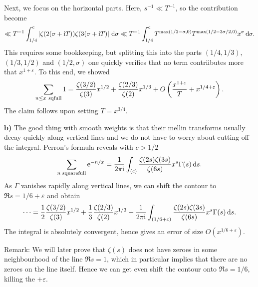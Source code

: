\documentclass[a4paper,11pt]{article}
\begin{document}
Next, we focus on the horizontal parts. Here, $s^{-1} \ll T^{-1}$, so the
contribution become
\[
    \ll T^{-1} \int_{1/4}^c \left\lvert \zeta(2(\sigma+\mathrm i T))\zeta(3(\sigma+\mathrm i T) \right\rvert \mathrm{\,d} 
    \sigma \ll T^{-1} \int_{1/4}^c T^{\max(1/2-\sigma, 0)} T^{\max(1/2-3\sigma/2,0)}
    x^\sigma \mathrm{\,d} \sigma.
\]
This requires some bookkeeping, but splitting this into the parts
$(1/4, 1/3)$, $(1/3, 1/2)$ and $(1/2, \sigma)$ one quickly verifies that 
no term contriibutes more that $x^{1+\varepsilon}$. To this end, we showed
\[
    \sum_{n \leq x \rm \ sqfull} 1 
    = \frac{\zeta(3/2)}{\zeta(3)}x^{1/2} + \frac{\zeta(2/3)}{\zeta(2)} x^{1/3}
    + O\left( \frac{x^{1+\varepsilon}}T + x^{1/4 + \varepsilon}\right).
\]
The claim follows upon setting $T = x^{3/4}$. 

\textbf{b)} The good thing with smooth weights is that their mellin transforms
usually decay quickly along vertical lines and we do not have to worry about cutting
off the integral. Perron's formula reveals with $c > 1/2$
\[
    \sum_{n \text{ squarefull}} \mathrm e^{-n/x} = \frac{1}{2 \pi \mathrm i} \int_{(c)} \frac{\zeta(2s) \zeta(3s)}
    {\zeta(6s)} x^s \Gamma(s) \mathrm{\,d} s.
\]
As $\Gamma$ vanishes rapidly along vertical lines, we can shift the contour to 
$\Re s = 1/6 + \varepsilon$ and obtain
\[
    \dots = \frac 12 \frac{\zeta(3/2)}{\zeta(3)} x^{1/2} + 
    \frac 13 \frac{\zeta(2/3)}{\zeta(2)} x^{1/3} + \frac{1}{2 \pi \mathrm i} \int_{(1/6 + \varepsilon)}
    \frac{\zeta(2s) \zeta(3s)} {\zeta(6s)} x^s \Gamma(s) \mathrm{\,d} s.
\]
The integral is absolutely convergent, hence gives an error of size
$O(x^{1/6+\varepsilon})$.

Remark: We will later prove that $\zeta(s)$ does not have zeroes in some
neighbourhood of the line $\Re s = 1$, which in particular implies that there
are no zeroes on the line itself. Hence we can get even shift the contour onto
$\Re s = 1/6$, killing the $+\varepsilon$. 
\end{document}
